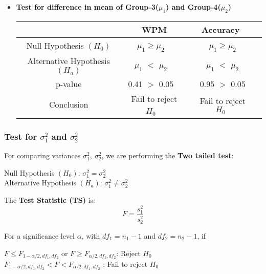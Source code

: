 \documentclass[12pt,a4paper]{report}
\begin{document}
\begin{enumerate}[label=\textbf{\arabic*})]
\begin{itemize}
\begin{center}
    \end{center}
    \vspace{2mm}
        \item \textbf{Test for difference in mean of Group-3($\mu_1$) and Group-4($\mu_2$)}
         \begin{center}
    \begin{tabular}{ |c|c|c|c|}
      \hline
       & WPM & Accuracy \\
      \hline
      Null Hypothesis $(H_0)$ & $\mu_1  \geq \mu_2$ \ & \ $\mu_1  \geq \mu_2$ \\ 
      \hline
      Alternative Hypothesis $(H_a)$ & $\mu_1$ $<$ $\mu_2$ \ & \ $\mu_1$ $<$ $\mu_2$ \\
      \hline
      p-value & 0.41 $>$ 0.05 \ & \ 0.95 $>$ 0.05 \\
      \hline
      Conclusion & Fail to reject $H_0$ \ & \ Fail to reject $H_0$ \\
      \hline
    \end{tabular}
    \end{center}
    \vspace{2mm}
    \end{itemize}
\end{enumerate}

\newpage
\subsubsection*{\Large{Test for $\sigma_1^2$ and $\sigma_2^2$}}
For comparing variances $\sigma_1^2,\  \sigma_2^2$, we are performing the \textbf{Two tailed test}:
\begin{center}
        Null Hypothesis $(H_0)$: $\sigma_1^2 = \sigma_2^2$\\
        Alternative Hypothesis $(H_a)$: $\sigma_1^2 \neq \sigma_2^2$ 
\end{center}
The \textbf{Test Statistic (TS)} is:
        \[F = \dfrac{s_1^2}{s_2^2}\]

For a significance level $\alpha$, with $df_1 = n_1-1$ and $df_2 = n_2-1$, if
\begin{center}
    $F\leq F_{1-\alpha/2,df_1,df_2}$ or $F\geq F_{\alpha/2,df_1,df_2}$: Reject $H_0$\\
    $F_{1-\alpha/2,df_1,df_2} < F < F_{\alpha/2,df_1,df_2}$ : Fail to reject $H_0$\\
\end{center}
\end{document}
